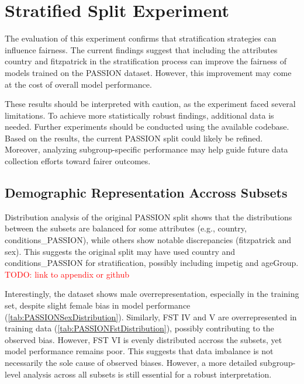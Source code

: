 \documentclass[12pt, a4paper, oneside]{book}   	%
\renewcommand{\todo}[1]{\textcolor{red}{TODO: #1}}
\begin{document}
		\section{Stratified Split Experiment}
		
		The evaluation of this experiment confirms that stratification strategies can influence fairness. The current findings suggest that including the attributes country and fitzpatrick in the stratification process can improve the fairness of models trained on the PASSION dataset. However, this improvement may come at the cost of overall model performance.
		
		These results should be interpreted with caution, as the experiment faced several limitations. To achieve more statistically robust findings, additional data is needed. Further experiments should be conducted using the available codebase. Based on the results, the current PASSION split could likely be refined. Moreover, analyzing subgroup-specific performance may help guide future data collection efforts toward fairer outcomes.
		
		
		\subsection{Demographic Representation Accross Subsets}
		Distribution analysis of the original PASSION split shows that the distributions between the subsets are balanced for some attributes (e.g., country, conditions\_PASSION), while others show notable discrepancies (fitzpatrick and sex). This suggests the original split may have used country and conditions\_PASSION for stratification, possibly including impetig and ageGroup.
		\todo{link to appendix or github} 	%
		
		Interestingly, the dataset shows male overrepresentation, especially in the training set, despite slight female bias in model performance (\autoref{tab:PASSIONSexDistribution}). Similarly, \gls{FST} IV and V are overrepresented in training data (\autoref{tab:PASSIONFstDistribution}), possibly contributing to the observed bias. However, \gls{FST} VI is evenly distributed accross the subsets, yet model performance remains poor. This suggests that data imbalance is not necessarily the sole cause of observed biases. However, a more detailed subgroup-level analysis across all subsets is still essential for a robust interpretation.
		
\end{document}
